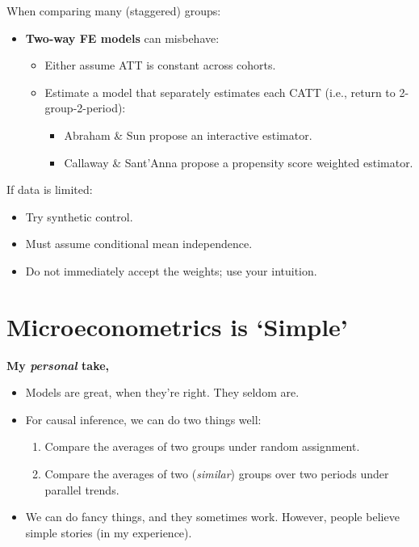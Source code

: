 \documentclass[
  letterpaper,
  DIV=11,
  numbers=noendperiod]{scrreprt}
\providecommand{\tightlist}{%
  \setlength{\itemsep}{0pt}\setlength{\parskip}{0pt}}\usepackage{longtable,booktabs,array}
\theoremstyle{definition}
\theoremstyle{remark}
\begin{document}
When comparing many (staggered) groups:

\begin{itemize}
\tightlist
\item
  \textbf{Two-way FE models} can misbehave:

  \begin{itemize}
  \tightlist
  \item
    Either assume ATT is constant across cohorts.
  \item
    Estimate a model that separately estimates each CATT (i.e., return
    to 2-group-2-period):

    \begin{itemize}
    \tightlist
    \item
      Abraham \& Sun propose an interactive estimator.
    \item
      Callaway \& Sant'Anna propose a propensity score weighted
      estimator.
    \end{itemize}
  \end{itemize}
\end{itemize}

If data is limited:

\begin{itemize}
\tightlist
\item
  Try synthetic control.
\item
  Must assume conditional mean independence.
\item
  Do not immediately accept the weights; use your intuition.
\end{itemize}

\section*{Microeconometrics is
`Simple'}\label{microeconometrics-is-simple}


\textbf{My \emph{personal} take,}

\begin{itemize}
\tightlist
\item
  Models are great, when they're right. They seldom are.
\item
  For causal inference, we can do two things well:

  \begin{enumerate}
  \def\labelenumi{\arabic{enumi}.}
  \tightlist
  \item
    Compare the averages of two groups under random assignment.
  \item
    Compare the averages of two (\emph{similar}) groups over two periods
    under parallel trends.
  \end{enumerate}
\item
  We can do fancy things, and they sometimes work. However, people
  believe simple stories (in my experience).
\end{itemize}
\end{document}
